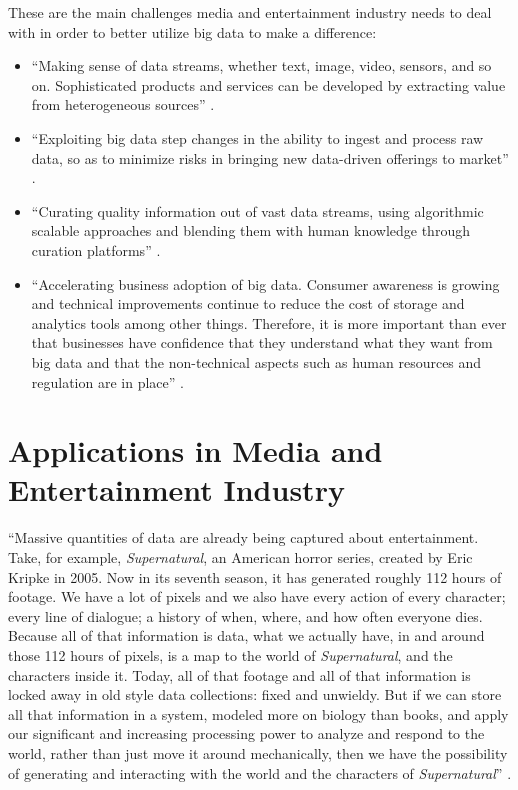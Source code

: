 \documentclass[sigconf]{acmart}
\begin{document}
These are the main challenges media and entertainment industry needs to deal with in order to better utilize big data to make a difference:
\begin{itemize}

  \item ``Making sense of data streams, whether text, image, video, sensors, and so on. Sophisticated products and services can be developed by extracting value from heterogeneous sources'' \cite{Lippell2016sectors}.
  
  \item ``Exploiting big data step changes in the ability to ingest and process raw data, so as to minimize risks in bringing new data-driven offerings to market'' \cite{Lippell2016sectors}.
  
  \item ``Curating quality information out of vast data streams, using algorithmic scalable approaches and blending them with human knowledge through curation platforms'' \cite{Lippell2016sectors}.
  
  \item ``Accelerating business adoption of big data. Consumer awareness is growing and technical improvements continue to reduce the cost of storage and analytics tools among other things. Therefore, it is more important than ever that businesses have confidence that they understand what they want from big data and that the non-technical aspects such as human resources and regulation are in place'' \cite{Lippell2016sectors}. 
  
\end{itemize}

\section{Applications in Media and Entertainment Industry}

``Massive quantities of data are already being captured about entertainment. Take, for example, {\em Supernatural}, an American horror series, created by Eric Kripke in 2005. Now in its seventh season, it has generated roughly 112 hours of footage. We have a lot of pixels and we also have every action of every character; every line of dialogue; a history of when, where, and how often everyone dies. Because all of that information is data, what we actually have, in and around those 112 hours of pixels, is a map to the world of {\em Supernatural}, and the characters inside it. Today, all of that footage and all of that information is locked away in old style data collections: fixed and unwieldy. But if we can store all that information in a system, modeled more on biology than books, and apply our significant and increasing processing power to analyze and respond to the world, rather than just move it around mechanically, then we have the possibility of generating and interacting with the world and the characters of {\em Supernatural}'' \cite{Schlieski2012data}.
\end{document}
